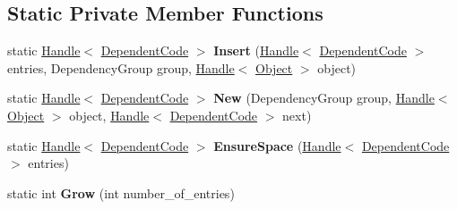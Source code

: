 \subsection*{Static Private Member Functions}
\begin{DoxyCompactItemize}
\item 
static \hyperlink{classv8_1_1internal_1_1_handle}{Handle}$<$ \hyperlink{classv8_1_1internal_1_1_dependent_code}{Dependent\+Code} $>$ {\bfseries Insert} (\hyperlink{classv8_1_1internal_1_1_handle}{Handle}$<$ \hyperlink{classv8_1_1internal_1_1_dependent_code}{Dependent\+Code} $>$ entries, Dependency\+Group group, \hyperlink{classv8_1_1internal_1_1_handle}{Handle}$<$ \hyperlink{classv8_1_1internal_1_1_object}{Object} $>$ object)\hypertarget{classv8_1_1internal_1_1_dependent_code_a23717ee6c4ba14388e055eb1e6f874b6}{}\label{classv8_1_1internal_1_1_dependent_code_a23717ee6c4ba14388e055eb1e6f874b6}

\item 
static \hyperlink{classv8_1_1internal_1_1_handle}{Handle}$<$ \hyperlink{classv8_1_1internal_1_1_dependent_code}{Dependent\+Code} $>$ {\bfseries New} (Dependency\+Group group, \hyperlink{classv8_1_1internal_1_1_handle}{Handle}$<$ \hyperlink{classv8_1_1internal_1_1_object}{Object} $>$ object, \hyperlink{classv8_1_1internal_1_1_handle}{Handle}$<$ \hyperlink{classv8_1_1internal_1_1_dependent_code}{Dependent\+Code} $>$ next)\hypertarget{classv8_1_1internal_1_1_dependent_code_a4028089f5d77c543a0dd559ef16ff893}{}\label{classv8_1_1internal_1_1_dependent_code_a4028089f5d77c543a0dd559ef16ff893}

\item 
static \hyperlink{classv8_1_1internal_1_1_handle}{Handle}$<$ \hyperlink{classv8_1_1internal_1_1_dependent_code}{Dependent\+Code} $>$ {\bfseries Ensure\+Space} (\hyperlink{classv8_1_1internal_1_1_handle}{Handle}$<$ \hyperlink{classv8_1_1internal_1_1_dependent_code}{Dependent\+Code} $>$ entries)\hypertarget{classv8_1_1internal_1_1_dependent_code_a39992bb6f129f89ca777c033e80a6419}{}\label{classv8_1_1internal_1_1_dependent_code_a39992bb6f129f89ca777c033e80a6419}

\item 
static int {\bfseries Grow} (int number\+\_\+of\+\_\+entries)\hypertarget{classv8_1_1internal_1_1_dependent_code_ad5b121b85a9936d205326a0cdcba3393}{}\label{classv8_1_1internal_1_1_dependent_code_ad5b121b85a9936d205326a0cdcba3393}

\end{DoxyCompactItemize}
